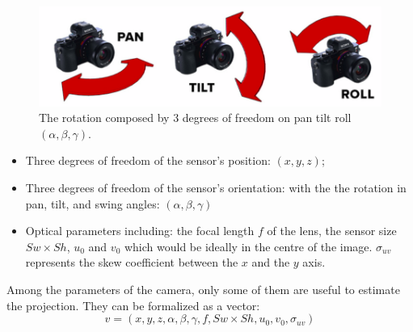  
\begin{figure}[t!]
\begin{center}
   \includegraphics[width=\linewidth]{img/PanTiltRoll.png}
  \caption{The rotation composed by 3 degrees of freedom on pan tilt roll$(\alpha,\beta,\gamma)$.}\label{fig:PanTiltRoll}
  \endminipage\hfill
  \end{center}
\end{figure}

\begin{itemize}
\item Three degrees of freedom of the sensor’s position: $(x, y, z)$;
\item Three degrees of freedom of the sensor’s orientation: with the  the rotation in pan, tilt, and swing angles: $(\alpha,\beta, \gamma)$ 
\item Optical parameters including: the focal length $f$ of the lens, the sensor size $Sw\times Sh$, $u_{0}$ and $v_0 $  which would be ideally in the centre of the image. $\sigma_{uv}$ represents the skew coefficient between the $x$ and the $y$ axis.
\end{itemize}

Among the parameters of the camera, only  some of them are useful to estimate the projection. They can be formalized as a vector:
\begin{equation}\label{eq:v}
v=(x,y,z,\alpha ,\beta,\gamma,f,Sw\times Sh,u_0,v_0,\sigma_{uv})
\end{equation}

